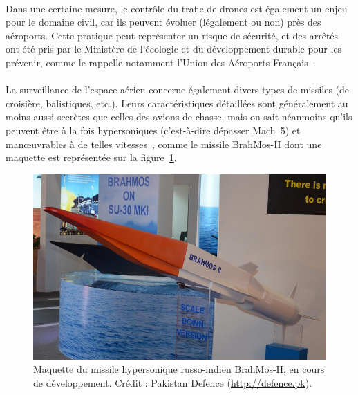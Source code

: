 	\paragraph{}
	Dans une certaine mesure, le contrôle du trafic de drones est également un enjeu pour le domaine civil, car ils peuvent évoluer (légalement ou non) près des aéroports. Cette pratique peut représenter un risque de sécurité, et des arrêtés ont été pris par le Ministère de l'écologie et du développement durable pour les prévenir, comme le rappelle notamment l'Union des Aéroports Français~\cite{dronesuaf}.
	
	\paragraph{}
	La surveillance de l'espace aérien concerne également divers types de missiles (de croisière, balistiques, etc.). Leurs caractéristiques détaillées sont généralement au moins aussi secrètes que celles des avions de chasse, mais on sait néanmoins qu'ils peuvent être à la fois hypersoniques (c'est-à-dire dépasser Mach~5) et manœuvrables à de telles vitesses~\cite{missiles}, comme le missile BrahMos-II dont une maquette est représentée sur la figure~\ref{fig:brahmos}.
	
	\begin{figure}[ht]
		\centering
		\includegraphics[width=\textwidth]{figures/brahmos-II}
		\caption{Maquette du missile hypersonique russo-indien BrahMos-II, en cours de développement. Crédit : Pakistan Defence (\url{http://defence.pk}).}
		\label{fig:brahmos}
	\end{figure}
	
